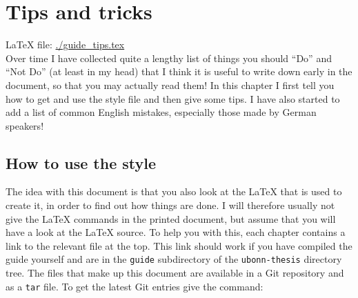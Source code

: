 
\chapter{Tips and tricks}%
\label{sec:tips}

\LaTeX{} file: \url{./guide_tips.tex}\\[1ex]
\noindent
Over time I have collected quite a lengthy list of things you should
\enquote{Do} and \enquote{Not Do} (at least in my head) that I think
it is useful to write down early in the document, so that you may
actually read them!  In this chapter I first tell you how to get
and use the style file and then give some tips.
I have also started to add a list of common English mistakes,
especially those made by German speakers!

\section{How to use the  style}%
\label{sec:tips:howto}

The idea with this document is that you also look at the \LaTeX{} that
is used to create it, in order to find out how things are done.  I
will therefore usually not give the \LaTeX{} commands in the printed
document, but assume that you will have a look at the \LaTeX{} source.
To help you with this, each chapter contains a link to the relevant
file at the top. This link should work if you have compiled the guide
yourself and are in the \texttt{guide} subdirectory of the
\texttt{ubonn-thesis} directory tree.  The files that make up this
document are available in a Git repository and as a
\texttt{tar} file. To get the latest Git entries give the
command:

